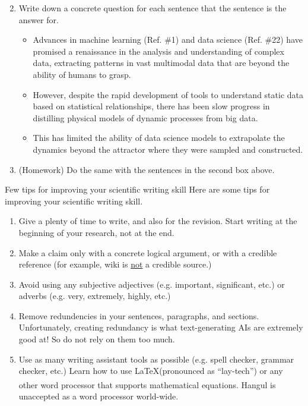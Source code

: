 \documentclass{beamer}
\begin{document}
\begin{frame}
\begin{enumerate}
    \setcounter{enumi}{1}
    \item Write down a concrete question for each sentence that the sentence is the answer for.
    \begin{itemize}
        \item Advances in machine learning (Ref. \#1) and data science (Ref. \#22) have promised a renaissance in the analysis and understanding of complex data, extracting patterns in vast multimodal data that are beyond the ability of humans to grasp. 
        \item However, despite the rapid development of tools to understand static data based on statistical relationships, there has been slow progress in distilling physical models of dynamic processes from big data. 
        \item This has limited the ability of data science models to extrapolate the dynamics beyond the attractor where they were sampled and constructed. 
    \end{itemize}
    \item (Homework) Do the same with the sentences in the second box above.
\end{enumerate}
\end{frame}


\begin{frame}{Few tips for improving your scientific writing skill}
Here are some tips for improving your scientific writing skill.
\begin{enumerate}
    \item Give a plenty of time to write, and also for the revision. Start writing at the beginning of your research, not at the end.
    \item Make a claim only with a concrete logical argument, or with a credible reference (for example, wiki is \underline{not} a credible source.)
    \item Avoid using any subjective adjectives (e.g. important, significant, etc.) or adverbs (e.g. very, extremely, highly, etc.)
    \item Remove redundencies in your sentences, paragraphs, and sections. Unfortunately, creating redundancy is what text-generating AIs are extremely good at! So do not rely on them too much.
    \item Use as many writing assistant tools as possible (e.g. spell checker, grammar checker, etc.) Learn how to use \LaTeX (pronounced as ``lay-tech'') or any other word processor that supports mathematical equations. Hangul\textsuperscript{\textregistered} is unaccepted as a word processor world-wide.
\end{enumerate}
\end{frame}
\end{document}
